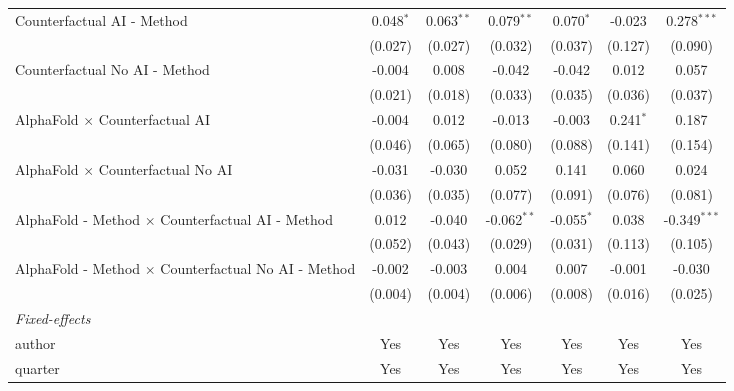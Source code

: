 \begin{tabular}{lcccccc}
   Counterfactual AI - Method                                 & 0.048$^{*}$ & 0.063$^{**}$ & 0.079$^{**}$  & 0.070$^{*}$  & -0.023      & 0.278$^{***}$\\   
                                                              & (0.027)     & (0.027)      & (0.032)       & (0.037)      & (0.127)     & (0.090)\\   
   Counterfactual No AI - Method                              & -0.004      & 0.008        & -0.042        & -0.042       & 0.012       & 0.057\\   
                                                              & (0.021)     & (0.018)      & (0.033)       & (0.035)      & (0.036)     & (0.037)\\   
   AlphaFold $\times$ Counterfactual AI                       & -0.004      & 0.012        & -0.013        & -0.003       & 0.241$^{*}$ & 0.187\\   
                                                              & (0.046)     & (0.065)      & (0.080)       & (0.088)      & (0.141)     & (0.154)\\   
   AlphaFold $\times$ Counterfactual No AI                    & -0.031      & -0.030       & 0.052         & 0.141        & 0.060       & 0.024\\   
                                                              & (0.036)     & (0.035)      & (0.077)       & (0.091)      & (0.076)     & (0.081)\\   
   AlphaFold - Method $\times$ Counterfactual AI - Method     & 0.012       & -0.040       & -0.062$^{**}$ & -0.055$^{*}$ & 0.038       & -0.349$^{***}$\\   
                                                              & (0.052)     & (0.043)      & (0.029)       & (0.031)      & (0.113)     & (0.105)\\   
   AlphaFold - Method $\times$ Counterfactual No AI - Method  & -0.002      & -0.003       & 0.004         & 0.007        & -0.001      & -0.030\\   
                                                              & (0.004)     & (0.004)      & (0.006)       & (0.008)      & (0.016)     & (0.025)\\   
   \midrule
   \emph{Fixed-effects}\\
   author                                                     & Yes         & Yes          & Yes           & Yes          & Yes         & Yes\\  
   quarter                                                    & Yes         & Yes          & Yes           & Yes          & Yes         & Yes\\  

\end{tabular}
